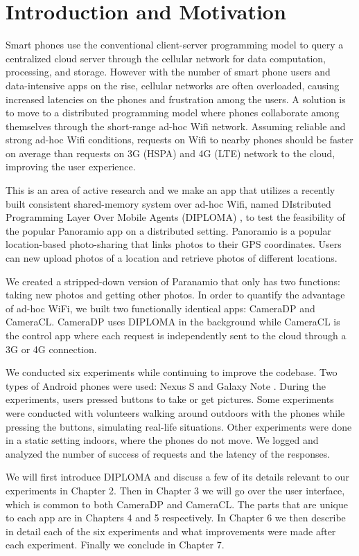 \chapter{Introduction and Motivation}

Smart phones use the conventional client-server programming model to query a centralized cloud server through the cellular network for data computation, processing, and storage. However with the number of smart phone users and data-intensive apps on the rise, cellular networks are often overloaded, causing increased latencies on the phones and frustration among the users. A solution is to move to a distributed programming model where phones collaborate among themselves through the short-range ad-hoc Wifi network.  Assuming reliable and strong ad-hoc Wifi conditions, requests on Wifi to nearby phones should be faster on average than requests on 3G (HSPA) and 4G (LTE) network to the cloud, improving the user experience. 

This is an area of active research and we make an app that utilizes a recently built consistent shared-memory system over ad-hoc Wifi, named DIstributed Programming Layer Over Mobile Agents (DIPLOMA) \cite{diploma}, to test the feasibility of the popular Panoramio \cite{Panoramio} app on a distributed setting. Panoramio is a popular location-based photo-sharing that links photos to their GPS coordinates. Users can new upload photos of a location and retrieve photos of different locations.

We created a stripped-down version of Paranamio that only has two functions: taking new photos and getting other photos. In order to quantify the advantage of ad-hoc WiFi, we built two functionally identical apps: CameraDP and CameraCL. CameraDP uses DIPLOMA in the background while CameraCL is the control app where each request is independently sent to the cloud through a 3G or 4G connection.

We conducted six experiments while continuing to improve the codebase. Two types of Android phones were used: Nexus S \cite{nexus} and Galaxy Note \cite{galaxy}. During the experiments, users pressed buttons to take or get pictures. Some experiments were conducted with volunteers walking around outdoors with the phones while pressing the buttons, simulating real-life situations. Other experiments were done in a static setting indoors, where the phones do not move. We logged and analyzed the number of success of requests and the latency of the responses.

We will first introduce DIPLOMA and discuss a few of its details relevant to our experiments in Chapter 2. Then in Chapter 3 we will go over the user interface, which is common to both CameraDP and CameraCL. The parts that are unique to each app are in Chapters 4 and 5 respectively. In Chapter 6 we then describe in detail each of the six experiments and what improvements were made after each experiment. Finally we conclude in Chapter 7.